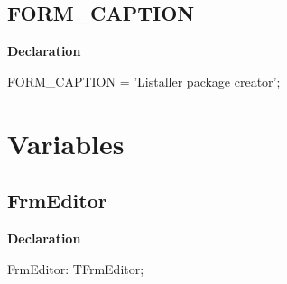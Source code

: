 \documentclass{report}
\newif\ifpdf
\begin{document}
\subsection*{FORM{\_}CAPTION}
\fi
\label{editor-FORM_CAPTION}
\begin{list}{}{
\setlength{\itemindent}{0cm}
\setlength{\listparindent}{0cm}
\setlength{\leftmargin}{\evensidemargin}
\addtolength{\leftmargin}{\tmplength}
\settowidth{\labelsep}{X}
\addtolength{\leftmargin}{\labelsep}
\setlength{\labelwidth}{\tmplength}
}
\item[\textbf{Declaration}\hfill]
\ifpdf
\begin{flushleft}
\fi
\begin{ttfamily}
FORM{\_}CAPTION = 'Listaller package creator';\end{ttfamily}

\ifpdf
\end{flushleft}
\fi

\end{list}
\section{Variables}
\ifpdf
\subsection*{\large{\textbf{FrmEditor}}\normalsize\hspace{1ex}\hrulefill}
\else
\subsection*{FrmEditor}
\fi
\label{editor-FrmEditor}
\begin{list}{}{
\setlength{\itemindent}{0cm}
\setlength{\listparindent}{0cm}
\setlength{\leftmargin}{\evensidemargin}
\addtolength{\leftmargin}{\tmplength}
\settowidth{\labelsep}{X}
\addtolength{\leftmargin}{\labelsep}
\setlength{\labelwidth}{\tmplength}
}
\item[\textbf{Declaration}\hfill]
\ifpdf
\begin{flushleft}
\fi
\begin{ttfamily}
FrmEditor: TFrmEditor;\end{ttfamily}

\ifpdf
\end{flushleft}
\fi

\end{list}
\ifpdf
\end{document}
